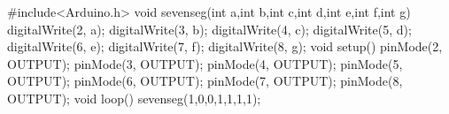 #include<Arduino.h>
void sevenseg(int a,int b,int c,int d,int e,int f,int g)
{
  digitalWrite(2, a); 
  digitalWrite(3, b); 
  digitalWrite(4, c); 
  digitalWrite(5, d); 
  digitalWrite(6, e); 
  digitalWrite(7, f);     
  digitalWrite(8, g); 
}
void setup() 
{
    pinMode(2, OUTPUT);  
    pinMode(3, OUTPUT);
    pinMode(4, OUTPUT);
    pinMode(5, OUTPUT);
    pinMode(6, OUTPUT);
    pinMode(7, OUTPUT);
    pinMode(8, OUTPUT);            
}
void loop() 
{
sevenseg(1,0,0,1,1,1,1);  
}